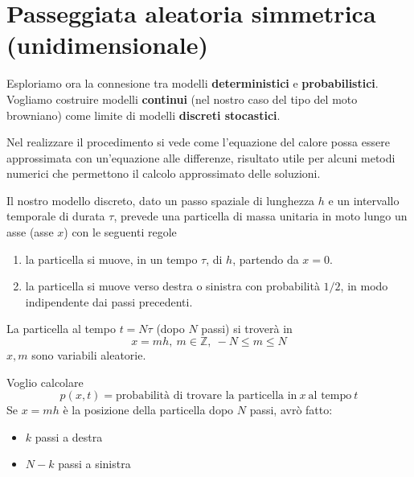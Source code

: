 \documentclass[10pt,a4paper,twoside,openright]{book}
\begin{document}
\section{Passeggiata aleatoria simmetrica (unidimensionale)}

Esploriamo ora la connesione tra modelli \textbf{deterministici} e \textbf{probabilistici}. Vogliamo costruire modelli \textbf{continui} (nel nostro caso del tipo del moto browniano) come limite di modelli \textbf{discreti stocastici}.

Nel realizzare il procedimento si vede come l'equazione del calore possa essere approssimata con un'equazione alle differenze, risultato utile per alcuni metodi numerici che permettono il calcolo approssimato delle soluzioni.

Il nostro modello discreto, dato un passo spaziale di lunghezza $\displaystyle h$ e un intervallo temporale di durata $\displaystyle \tau $, prevede una particella di massa unitaria in moto lungo un asse (asse $\displaystyle x$) con le seguenti regole
\begin{enumerate}
\item la particella si muove, in un tempo $\displaystyle \tau $, di $\displaystyle h$, partendo da $\displaystyle x=0$.
\item la particella si muove verso destra o sinistra con probabilità $\displaystyle 1/2$, in modo indipendente dai passi precedenti.
\end{enumerate}

La particella al tempo $\displaystyle t=N\tau $ (dopo $\displaystyle N$ passi) si troverà in
\begin{equation*}
x=mh,\ m\in \mathbb{Z},\ -N\leqslant m\leqslant N
\end{equation*}
$\displaystyle x,m$ sono variabili aleatorie.

Voglio calcolare
\begin{equation*}
p(x,t) =\text{probabilità di trovare la particella in} \ x\ \text{al tempo} \ t
\end{equation*}
Se $\displaystyle x=mh$ è la posizione della particella dopo $\displaystyle N$ passi, avrò fatto:
\begin{itemize}
\item $\displaystyle k$ passi a destra
\item $\displaystyle N-k$ passi a sinistra
\end{itemize}
\end{document}
